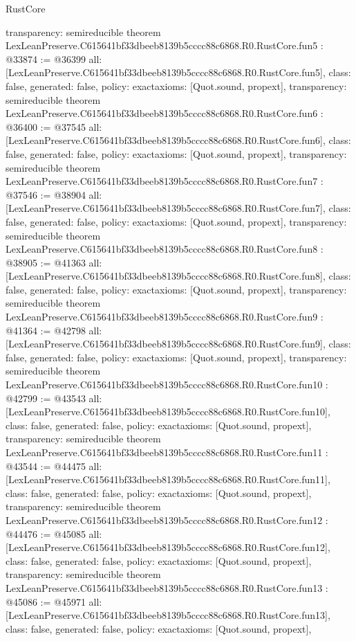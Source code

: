 \begin{lexlean}{RustCore}
\begin{coremodule}
{  transparency: semireducible
}
theorem LexLeanPreserve.C615641bf33dbeeb8139b5cccc88c6868.R0.RustCore.fun5 : @33874 := @36399 {
  all: [LexLeanPreserve.C615641bf33dbeeb8139b5cccc88c6868.R0.RustCore.fun5],
  class: false,
  generated: false,
  policy: exact{axioms: [Quot.sound, propext]},
  transparency: semireducible
}
theorem LexLeanPreserve.C615641bf33dbeeb8139b5cccc88c6868.R0.RustCore.fun6 : @36400 := @37545 {
  all: [LexLeanPreserve.C615641bf33dbeeb8139b5cccc88c6868.R0.RustCore.fun6],
  class: false,
  generated: false,
  policy: exact{axioms: [Quot.sound, propext]},
  transparency: semireducible
}
theorem LexLeanPreserve.C615641bf33dbeeb8139b5cccc88c6868.R0.RustCore.fun7 : @37546 := @38904 {
  all: [LexLeanPreserve.C615641bf33dbeeb8139b5cccc88c6868.R0.RustCore.fun7],
  class: false,
  generated: false,
  policy: exact{axioms: [Quot.sound, propext]},
  transparency: semireducible
}
theorem LexLeanPreserve.C615641bf33dbeeb8139b5cccc88c6868.R0.RustCore.fun8 : @38905 := @41363 {
  all: [LexLeanPreserve.C615641bf33dbeeb8139b5cccc88c6868.R0.RustCore.fun8],
  class: false,
  generated: false,
  policy: exact{axioms: [Quot.sound, propext]},
  transparency: semireducible
}
theorem LexLeanPreserve.C615641bf33dbeeb8139b5cccc88c6868.R0.RustCore.fun9 : @41364 := @42798 {
  all: [LexLeanPreserve.C615641bf33dbeeb8139b5cccc88c6868.R0.RustCore.fun9],
  class: false,
  generated: false,
  policy: exact{axioms: [Quot.sound, propext]},
  transparency: semireducible
}
theorem LexLeanPreserve.C615641bf33dbeeb8139b5cccc88c6868.R0.RustCore.fun10 : @42799 := @43543 {
  all: [LexLeanPreserve.C615641bf33dbeeb8139b5cccc88c6868.R0.RustCore.fun10],
  class: false,
  generated: false,
  policy: exact{axioms: [Quot.sound, propext]},
  transparency: semireducible
}
theorem LexLeanPreserve.C615641bf33dbeeb8139b5cccc88c6868.R0.RustCore.fun11 : @43544 := @44475 {
  all: [LexLeanPreserve.C615641bf33dbeeb8139b5cccc88c6868.R0.RustCore.fun11],
  class: false,
  generated: false,
  policy: exact{axioms: [Quot.sound, propext]},
  transparency: semireducible
}
theorem LexLeanPreserve.C615641bf33dbeeb8139b5cccc88c6868.R0.RustCore.fun12 : @44476 := @45085 {
  all: [LexLeanPreserve.C615641bf33dbeeb8139b5cccc88c6868.R0.RustCore.fun12],
  class: false,
  generated: false,
  policy: exact{axioms: [Quot.sound, propext]},
  transparency: semireducible
}
theorem LexLeanPreserve.C615641bf33dbeeb8139b5cccc88c6868.R0.RustCore.fun13 : @45086 := @45971 {
  all: [LexLeanPreserve.C615641bf33dbeeb8139b5cccc88c6868.R0.RustCore.fun13],
  class: false,
  generated: false,
  policy: exact{axioms: [Quot.sound, propext]},
}
\end{coremodule}
\end{lexlean}
